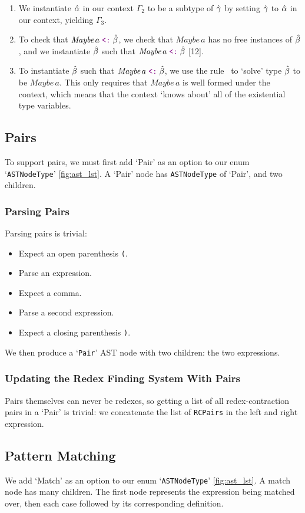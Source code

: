 \begin{enumerate}
    \item We instantiate $\hat{\alpha}$ in our context $\Gamma_2$ to be a subtype of $\hat{\gamma}$ by setting $\hat{\gamma}$ to $\hat{\alpha}$ in our context, yielding $\Gamma_3$.
    \item To check that $\textit{Maybe}\,a \subtype \bhat$, we check that $\textit{Maybe}\,a$ has no free instances of $\hat{\beta}$, and we instantiate $\hat{\beta}$ such that $\textit{Maybe}\,a \subtype \bhat$ [12].
    \item To instantiate $\hat{\beta}$ such that $\textit{Maybe}\,a \subtype \bhat$, we use the rule \InstRSolve\ to `solve' type $\hat{\beta}$ to be $\textit{Maybe}\,a$. This only requires that $\textit{Maybe}\,a$ is well formed under the context, which means that the context `knows about' all of the existential type variables. %
\end{enumerate}

\subsection{Pairs}
To support pairs, we must first add `Pair' as an option to our enum `\verb|ASTNodeType|' \ref{fig:ast_lst}. A `Pair' node has \verb|ASTNodeType| of `Pair', and two children.

\subsubsection{Parsing Pairs}
Parsing pairs is trivial:
\begin{itemize}
    \item Expect an open parenthesis \verb|(|.
    \item Parse an expression.
    \item Expect a comma.
    \item Parse a second expression.
    \item Expect a closing parenthesis \verb|)|.
\end{itemize}
\noindent We then produce a `\verb|Pair|' \ac{AST} node with two children: the two expressions.
\subsubsection{Updating the Redex Finding System With Pairs}
Pairs themselves can never be redexes, so getting a list of all redex-contraction pairs in a `Pair' is trivial: we concatenate the list of \verb|RCPairs| in the left and right expression.

\subsection{Pattern Matching}
We add `Match' as an option to our enum `\verb|ASTNodeType|' \ref{fig:ast_lst}. A match node has many children. The first node represents the expression being matched over, then each case followed by its corresponding definition.
 
